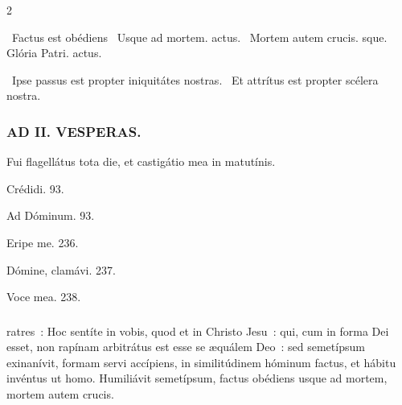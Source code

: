 \documentclass[9pt,twoside]{extarticle}
\begin{document}
\begin{multicols}{2}
{\begin{tightlist}{}
\item {}~Factus est obédiens \textred{*}~Usque ad mortem. actus. ~Mortem autem crucis. sque. Glória Patri. actus.
\item {}~Ipse passus est propter iniquitátes nostras. ~Et attrítus est propter scélera nostra.
\end{tightlist}

\subsubsection*{\center \textsc{AD II. VESPERAS.}}
\begin{tightlist}{}
\item {} Fui flagellátus tota die, et castigátio mea in matutínis.
\item {} Crédidi. 93. 
\item {} Ad Dóminum. 93. 
\item {} Eripe me. 236. 
\item {} Dómine, clamávi. 237. 
\item {} Voce mea. 238.
\end{tightlist}

\subsubsection*{}
ratres~: Hoc sentíte in vobis, quod et in Christo Jesu~: qui, cum in forma Dei esset, non rapínam arbitrátus est esse se æquálem Deo~: sed semetípsum exinanívit, formam servi accípiens, in similitúdinem hóminum factus, et hábitu invéntus ut homo. Humiliávit semetípsum, factus obédiens usque ad mortem, mortem autem crucis.

}
\end{multicols}
\end{document}
